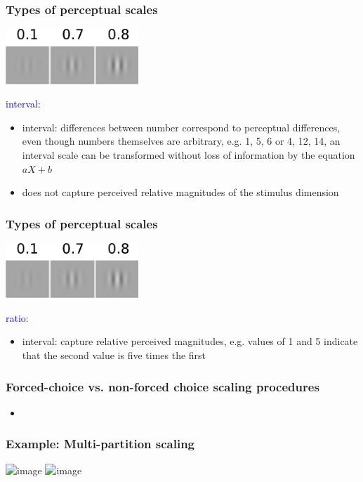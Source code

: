 \documentclass[]{beamer}
\begin{document}
\begin{frame}
 \frametitle{Types of perceptual scales}
\begin{center}
\includegraphics[width=50mm]{figs/l6/three_contrasts.png} 
\end{center}

\textcolor{blue}{interval:}
\begin{itemize}
 \item interval: differences between number correspond to perceptual differences, even though numbers themselves are arbitrary, e.g. 1, 5, 6 or 4, 12, 14, an interval scale can be transformed without loss of information by the equation $aX+b$
 \item does not capture perceived relative magnitudes of the stimulus dimension
\end{itemize}
\end{frame}


\begin{frame}
 \frametitle{Types of perceptual scales}
\begin{center}
\includegraphics[width=50mm]{figs/l6/three_contrasts.png} 
\end{center}

\textcolor{blue}{ratio:}
\begin{itemize}
 \item interval: capture relative perceived magnitudes, e.g. values of 1 and 5 indicate that the second value is five times the first 
\end{itemize}
\end{frame}


\begin{frame}
 \frametitle{Forced-choice vs. non-forced choice scaling procedures}
\begin{itemize}
 \item
\end{itemize}
\end{frame}

\begin{frame}
 \frametitle{Example: Multi-partition scaling}
\begin{center}
\includegraphics<1>[width=70mm]{figs/l6/whittle_display.png} 
\includegraphics<2>[width=70mm]{figs/l6/whittle_scale.png} 
\end{center}
\end{frame}
\end{document}
